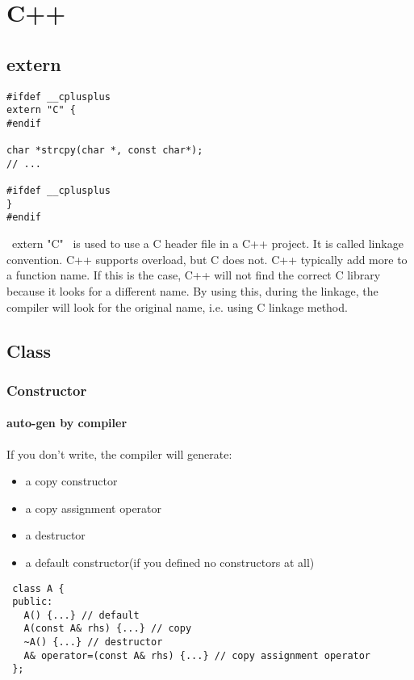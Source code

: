 \section{C++}

\subsection{extern}
\begin{lstlisting}
#ifdef __cplusplus
extern "C" {
#endif

char *strcpy(char *, const char*);
// ...

#ifdef __cplusplus
}
#endif
\end{lstlisting}

~extern "C"~ is used to use a C header file in a C++ project.  It is
called linkage convention.  C++ supports overload, but C does not.
C++ typically add more to a function name.  If this is the case, C++
will not find the correct C library because it looks for a different
name.  By using this, during the linkage, the compiler will look for
the original name, i.e. using C linkage method.



\subsection{Class}
\subsubsection{Constructor}

\paragraph{auto-gen by compiler}

 If you don't write, the compiler will generate:
\begin{itemize}
\item a copy constructor
\item a copy assignment operator
\item a destructor
\item a default constructor(if you defined no constructors at all)
\end{itemize}

\begin{lstlisting}
 class A {
 public:
   A() {...} // default
   A(const A& rhs) {...} // copy
   ~A() {...} // destructor
   A& operator=(const A& rhs) {...} // copy assignment operator
 };
\end{lstlisting}

